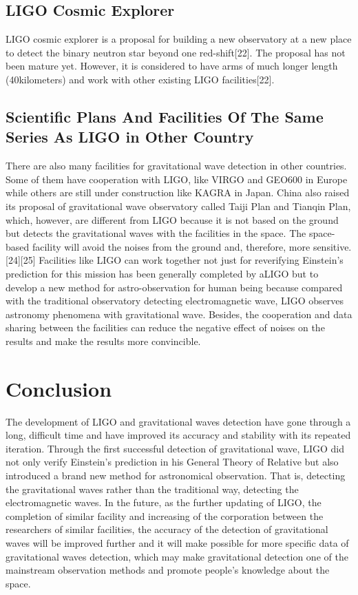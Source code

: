 \documentclass[journal,comsoc,twoside]{IEEEtran}
\begin{document}
\subsection{LIGO Cosmic Explorer}
LIGO cosmic explorer is a proposal for building a new observatory at a new place to detect the binary neutron star beyond one red-shift[22]. The proposal has not been mature yet. However, it is considered to have arms of much longer length (40kilometers) and work with other existing LIGO facilities[22].
\subsection{Scientific Plans And Facilities Of The Same Series As LIGO in Other Country}
There are also many facilities for gravitational wave detection in other countries. Some of them have cooperation with LIGO, like VIRGO and GEO600 in Europe while others are still under construction like KAGRA in Japan. China also raised its proposal of gravitational wave observatory called Taiji Plan and Tianqin Plan, which, however, are different from LIGO because it is not based on the ground but detects the gravitational waves with the facilities in the space. The space-based facility will avoid the noises from the ground and, therefore, more sensitive.[24][25] Facilities like LIGO can work together not just for reverifying Einstein's prediction for this mission has been generally completed by aLIGO but to develop a new method for astro-observation for human being because compared with the traditional observatory detecting electromagnetic wave, LIGO observes astronomy phenomena with gravitational wave. Besides, the cooperation and data sharing between the facilities can reduce the negative effect of noises on the results and make the results more convincible.
\section{Conclusion}
The development of LIGO and gravitational waves detection have gone through a long, difficult time and have improved its accuracy and stability with its repeated iteration. Through the first successful detection of gravitational wave, LIGO did not only verify Einstein's prediction in his General Theory of Relative but also introduced a brand new method for astronomical observation. That is, detecting the gravitational waves rather than the traditional way, detecting the electromagnetic waves. In the future, as the further updating of LIGO, the completion of similar facility and increasing of the corporation between the researchers of similar facilities, the accuracy of the detection of gravitational waves will be improved further and it will make possible for more specific data of gravitational waves detection, which may make gravitational detection one of the mainstream observation methods and promote people's knowledge about the space.
\end{document}

